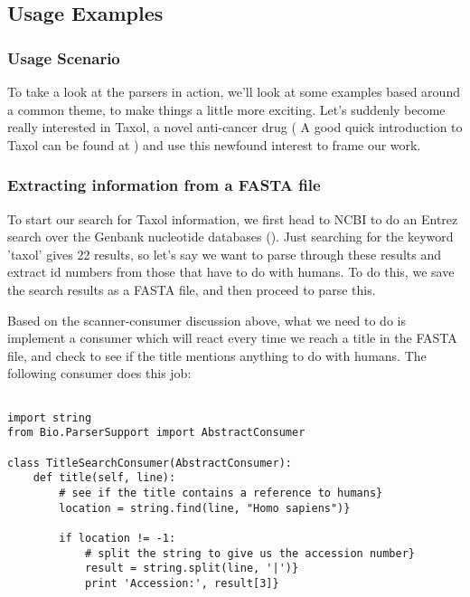 \documentclass[dvips]{article}
\begin{document}
\subsection{Usage Examples}


\subsubsection{Usage Scenario}


To take a look at the parsers in action, we'll look at some examples based around a common theme, to make things a little more exciting. Let's suddenly become really interested in Taxol, a novel anti-cancer drug ( A good quick introduction to Taxol can be found at ) and use this newfound interest to frame our work.


\subsubsection{Extracting information from a FASTA file}


To start our search for Taxol information, we first head to NCBI to do an Entrez search over the Genbank nucleotide databases ().  Just searching for the keyword 'taxol' gives 22 results, so let's say we want to parse through these results and extract id numbers from those that have to do with humans. To do this, we save the search results as a FASTA file, and then proceed to parse this.


Based on the scanner-consumer discussion above, what we need to do is implement a consumer which will react every time we reach a title in the FASTA file, and check to see if the title mentions anything to do with humans. The following consumer does this job:

\begin{verbatim}

import string
from Bio.ParserSupport import AbstractConsumer

class TitleSearchConsumer(AbstractConsumer):
    def title(self, line):
        # see if the title contains a reference to humans}
        location = string.find(line, "Homo sapiens")}
        
        if location != -1:
            # split the string to give us the accession number}
            result = string.split(line, '|')}
            print 'Accession:', result[3]}

\end{verbatim}
\end{document}
